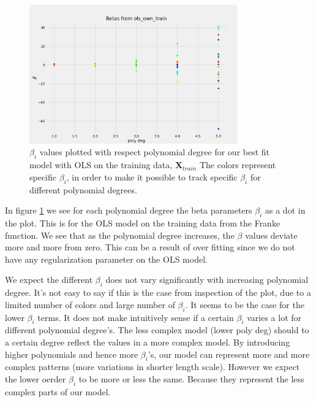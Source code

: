 \begin{figure}[H]
    \centering
    \includegraphics[width=0.8\textwidth]{Figures/b_beta.png}
    \caption{ $\beta _i$ values plotted with respect polynomial degree for our best
    fit model with OLS on the training data, $\bm{X} _{train} $ 
    The colors represent specific $\beta _i$, in order to make it possible to
    track specific $\beta _i$ for different polynomial degrees.      }
    \label{fig:beta_plot}
\end{figure}

In figure \ref{fig:beta_plot} we see for each polynomial degree the beta
parameters $\beta_i$ as a dot in the plot. This is for the OLS model on the
training data from the Franke function. We see that as the polynomial degree increases, the $\beta$
values deviate more and more from zero. This can be a result of over fitting
since we do not have any regularization parameter on the OLS model.

We expect the different $\beta _i$ does not vary significantly with increasing
polynomial degree. It's not easy to say if this is the case from inspection of
the plot, due to a limited number of colors and large number of $\beta _i$. It seems to be the case for the
lower $\beta _i$ terms. It does not make intuitively sense if a certain $\beta _i$ varies a
lot for different polynomial degree's. The less complex model (lower poly deg) should to a certain degree
reflect the values in a more complex model. By introducing higher polynomials
and hence more $\beta _i$'s, our model can represent more and more complex
patterns (more variations in shorter length scale). However we expect the lower
oerder $\beta _i$ to be more or less the same. Because they represent the less
complex parts of our model. 
 


